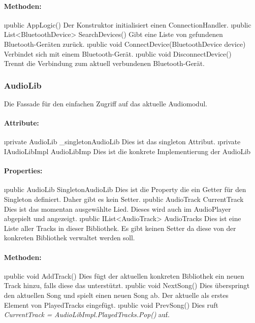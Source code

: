 \documentclass[../entwurf.tex]{subfiles}
\begin{document}
				\paragraph{Methoden:}
					\begin{itemize}
						\i{public AppLogic()} Der Konstruktor initialisiert einen ConnectionHandler.
						\i{public List<BluetoothDevice> SearchDevices()} Gibt eine Liste von gefundenen Bluetooth-Geräten zurück.
						\i{public void ConnectDevice(BluetoothDevice device)} Verbindet sich mit einem Bluetooth-Gerät.
						\i{public void DisconnectDevice()} Trennt die Verbindung zum aktuell verbundenen Bluetooth-Gerät.
					\end{itemize}
			\subsubsection{AudioLib}
				Die Fassade für den einfachen Zugriff auf das aktuelle Audiomodul.
				\paragraph{Attribute:}
					\begin{itemize}
						\i{private AudioLib \_singletonAudioLib} Dies ist das singleton Attribut.
						\i{private IAudioLibImpl AudioLibImp} Dies ist die konkrete Implementierung der
						AudioLib
					\end{itemize}
				\paragraph{Properties:}
					\begin{itemize}
						\i{public AudioLib SingletonAudioLib} Dies ist die Property die ein Getter für den
						Singleton definiert. Daher gibt es kein Setter.
						\i{public AudioTrack CurrentTrack} Dies ist das momentan ausgewählte Lied. Dieses
						wird auch im AudioPlayer abgepielt und angezeigt.
						\i{public IList<AudioTrack> AudioTracks} Dies ist eine Liste aller Tracks in dieser
						Bibliothek. Es gibt keinen Setter da diese von der konkreten Bibliothek verwaltet werden soll.
					\end{itemize}
				\paragraph{Methoden:}
					\begin{itemize}
						\i{public void AddTrack()} Dies fügt der aktuellen konkreten Bibliothek ein neuen Track hinzu,
						falls diese das unterstützt.
						\i{public void NextSong()} Dies überspringt den aktuellen Song und spielt einen neuen Song ab.
						Der aktuelle als erstes Element von PlayedTracks eingefügt.
						\i{public void PrevSong()} Dies ruft \textit{CurrentTrack = AudioLibImpl.PlayedTracks.Pop()} auf.
					\end{itemize}
\end{document}
